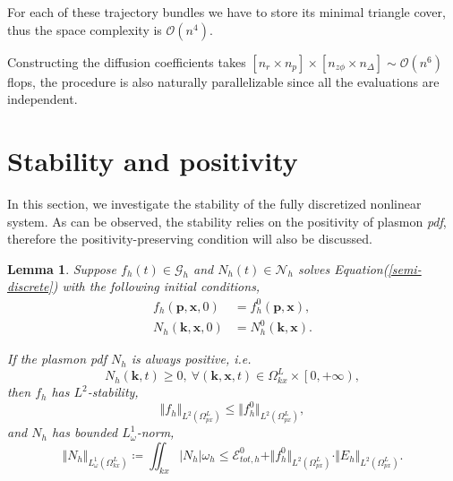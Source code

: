 \documentclass{article}
\newtheorem{lemma}{Lemma}
\numberwithin{equation}{section}
\begin{document}
For each of these trajectory bundles we have to store its minimal triangle cover, thus the space complexity is $\mathcal{O}(n^{4})$.


Constructing the diffusion coefficients takes $\left[n_{r}\times n_{p}\right] \times \left[n_{z\phi} \times n_{\Delta} \right] \sim \mathcal{O}(n^{6})$ flops, the procedure is also naturally parallelizable since all the evaluations are independent.

\section{Stability and positivity} \label{sec:stability}

In this section, we investigate the stability of the fully discretized nonlinear system. As can be observed, the stability relies on the positivity of plasmon \textit{pdf}, therefore the positivity-preserving  condition will also be discussed.

\begin{lemma}
    Suppose $f_{h}(t)\in\mathcal{G}_{h}$ and $N_{h}(t)\in\mathcal{N}_{h}$ solves Equation(\ref{semi-discrete}) with the following initial conditions,
    \begin{equation*}
        \begin{split}
            f_{h}(\mathbf{p},\mathbf{x},0)&=f_{h}^{0}(\mathbf{p},\mathbf{x}),\\
            N_{h}(\mathbf{k},\mathbf{x},0)&=N_{h}^{0}(\mathbf{k},\mathbf{x}).
        \end{split}
    \end{equation*}

    If the plasmon \textit{pdf} $N_{h}$ is always positive, i.e.
    \begin{equation*}
        N_{h}(\mathbf{k},t)\geq0,~\forall\left(\mathbf{k}, \mathbf{x}, t\right)\in\Omega^{L}_{kx}\times \left[0,+\infty\right),
    \end{equation*}
    then $f_{h}$ has $L^{2}$-stability,
    \begin{equation*}
        \Vert f_{h}\Vert_{L^{2}(\Omega_{px}^{L})}\leq\Vert f_{h}^{0}\Vert_{L^{2}(\Omega_{px}^{L})},
    \end{equation*}
    and $N_{h}$ has bounded $L^{1}_{\omega}$-norm,
    \begin{equation*}
        \Vert N_{h}\Vert_{L_{\omega}^{1}(\Omega_{kx}^{L})}\coloneqq\iint_{kx}|N_{h}|\omega_{h}\leq\mathcal{E}_{tot,h}^{0}+\Vert f_{h}^{0}\Vert_{L^{2}(\Omega_{px}^{L})}\cdot\Vert E_{h}\Vert_{L^{2}(\Omega_{px}^{L})}.
    \end{equation*}
\end{lemma}
\end{document}
